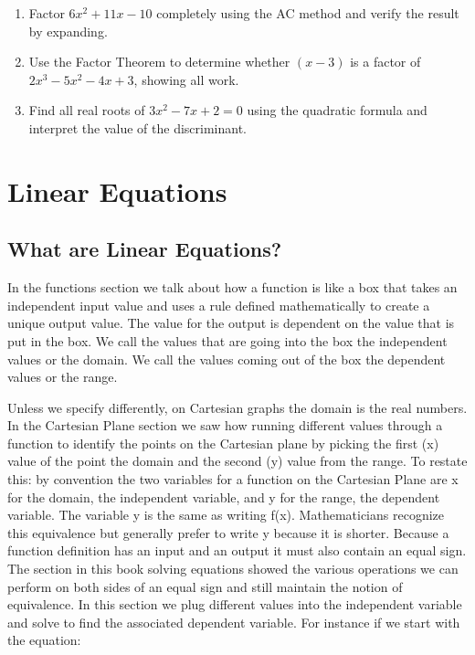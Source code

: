 \begin{enumerate}
    \item Factor $6x^2 + 11x - 10$ completely using the AC method and verify the result by expanding.
    \item Use the Factor Theorem to determine whether $(x - 3)$ is a factor of $2x^3 - 5x^2 - 4x + 3$, showing all work.
    \item Find all real roots of $3x^2 - 7x + 2 = 0$ using the quadratic formula and interpret the value of the discriminant.
\end{enumerate}

\section{Linear Equations}
\label{sec:line-d9b6}

\subsection{What are Linear Equations?}
\label{sss:what-22ca}

In the functions section we talk about how a function is like a box that takes an
independent input value and uses a rule defined mathematically to create a unique output
value. The value for the output is dependent on the value that is put in the box. We call
the values that are going into the box the independent values or the domain. We call the
values coming out of the box the dependent values or the range.

Unless we specify differently, on Cartesian graphs the domain is the real numbers. In the
Cartesian Plane section we saw how running different values through a function to identify
the points on the Cartesian plane by picking the first (x) value of the point the domain
and the second (y) value from the range. To restate this: by convention the two variables
for a function on the Cartesian Plane are x for the domain, the independent variable, and
y for the range, the dependent variable. The variable y is the same as writing f(x).
Mathematicians recognize this equivalence but generally prefer to write y because it is
shorter. Because a function definition has an input and an output it must also contain an
equal sign. The section in this book solving equations showed the various operations we
can perform on both sides of an equal sign and still maintain the notion of equivalence.
In this section we plug different values into the independent variable and solve to find
the associated dependent variable. For instance if we start with the equation:

